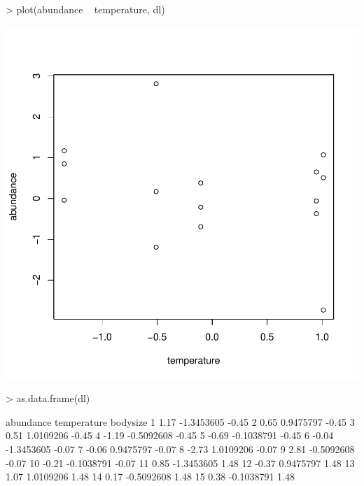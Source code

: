 \documentclass{article}
\numberwithin{exercise}{section}
\begin{document}
\newpage

\begin{Schunk}
\begin{Sinput}
> plot(abundance ~ temperature, dl)
\end{Sinput}
\end{Schunk}
\includegraphics{sweave-015}

\newpage

\begin{Schunk}
\begin{Sinput}
> as.data.frame(dl)
\end{Sinput}
\begin{Soutput}
   abundance temperature bodysize
1       1.17  -1.3453605    -0.45
2       0.65   0.9475797    -0.45
3       0.51   1.0109206    -0.45
4      -1.19  -0.5092608    -0.45
5      -0.69  -0.1038791    -0.45
6      -0.04  -1.3453605    -0.07
7      -0.06   0.9475797    -0.07
8      -2.73   1.0109206    -0.07
9       2.81  -0.5092608    -0.07
10     -0.21  -0.1038791    -0.07
11      0.85  -1.3453605     1.48
12     -0.37   0.9475797     1.48
13      1.07   1.0109206     1.48
14      0.17  -0.5092608     1.48
15      0.38  -0.1038791     1.48
\end{Soutput}
\end{Schunk}

\newpage
\end{document}
